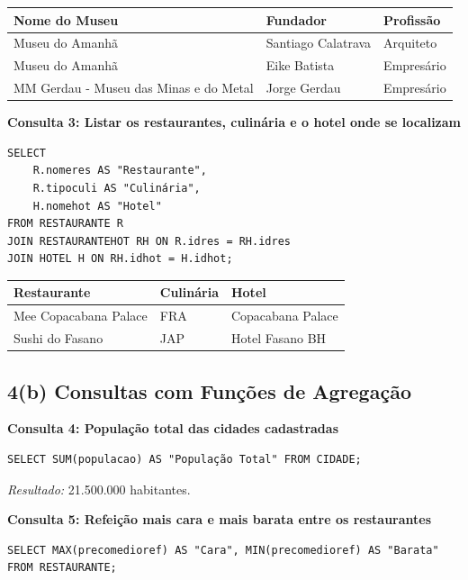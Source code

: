 \documentclass[11pt, a4paper]{article}
\begin{document}
\begin{table}[h]
\centering
\begin{tabular}{lll}
\toprule
\textbf{Nome do Museu} & \textbf{Fundador} & \textbf{Profissão} \\
\midrule
Museu do Amanhã & Santiago Calatrava & Arquiteto \\
Museu do Amanhã & Eike Batista & Empresário \\
MM Gerdau - Museu das Minas e do Metal & Jorge Gerdau & Empresário \\
\bottomrule
\end{tabular}
\end{table}

\textbf{Consulta 3: Listar os restaurantes, culinária e o hotel onde se localizam}
\begin{lstlisting}
SELECT
    R.nomeres AS "Restaurante",
    R.tipoculi AS "Culinária",
    H.nomehot AS "Hotel"
FROM RESTAURANTE R
JOIN RESTAURANTEHOT RH ON R.idres = RH.idres
JOIN HOTEL H ON RH.idhot = H.idhot;
\end{lstlisting}

\begin{table}[h]
\centering
\begin{tabular}{lll}
\toprule
\textbf{Restaurante} & \textbf{Culinária} & \textbf{Hotel} \\
\midrule
Mee Copacabana Palace & FRA & Copacabana Palace \\
Sushi do Fasano & JAP & Hotel Fasano BH \\
\bottomrule
\end{tabular}
\end{table}

\subsection{4(b) Consultas com Funções de Agregação}

\textbf{Consulta 4: População total das cidades cadastradas}
\begin{lstlisting}
SELECT SUM(populacao) AS "População Total" FROM CIDADE;
\end{lstlisting}
\textit{Resultado:} 21.500.000 habitantes.

\textbf{Consulta 5: Refeição mais cara e mais barata entre os restaurantes}
\begin{lstlisting}
SELECT MAX(precomedioref) AS "Cara", MIN(precomedioref) AS "Barata" FROM RESTAURANTE;
\end{lstlisting}
\end{document}
